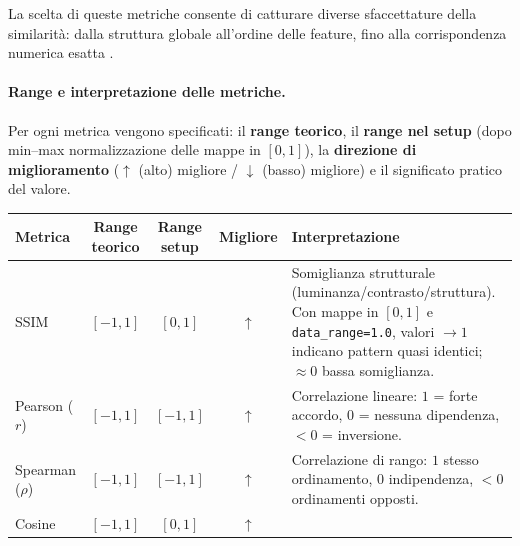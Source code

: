 \documentclass[12pt,a4paper,oneside]{report}
\numberwithin{figure}{chapter}
\numberwithin{table}{chapter}
\begin{document}
La scelta di queste metriche consente di catturare diverse sfaccettature della
similarità: dalla struttura globale all’ordine delle feature, fino alla
corrispondenza numerica esatta \citep{leventi2023consistency,
      samek2016evaluating}.

\paragraph{Range e interpretazione delle metriche.}
Per ogni metrica vengono specificati: il \textbf{range teorico}, il
\textbf{range nel setup} (dopo min–max normalizzazione delle mappe in $[0,1]$),
la \textbf{direzione di miglioramento} ($\uparrow$ (alto) migliore / $\downarrow$ (basso)
migliore) e il significato pratico del valore.

\begin{table}[H]
      \centering
      \begin{minipage}{0.98\linewidth}
            \small
            \setlength{\tabcolsep}{5pt}
            \renewcommand{\arraystretch}{1.15}
            \begin{tabularx}{\linewidth}{l c c c Y}
                  \hline
                  \textbf{Metrica}  & \textbf{Range teorico} & \textbf{Range setup} & \textbf{Migliore} & \textbf{Interpretazione}                                                                             \\
                  \hline
                  SSIM              & $[-1,1]$               & $[0,1]$            & $\uparrow$      &
                  Somiglianza strutturale (luminanza/contrasto/struttura). Con mappe in $[0,1]$ e \texttt{data\_range=1.0}, valori $\to 1$ indicano pattern quasi identici; $\approx 0$ bassa somiglianza. \\
                  Pearson ($r$)     & $[-1,1]$               & $[-1,1]$           & $\uparrow$      &
                  Correlazione lineare: $1$ = forte accordo, $0$ = nessuna dipendenza, $<0$ = inversione.                                                                                                  \\
                  Spearman ($\rho$) & $[-1,1]$               & $[-1,1]$           & $\uparrow$      &
                  Correlazione di rango: $1$ stesso ordinamento, $0$ indipendenza, $<0$ ordinamenti opposti.                                                                                               \\
                  Cosine            & $[-1,1]$               & $[0,1]$            & $\uparrow$      &

\end{tabularx}
\end{minipage}
\end{table}
\end{document}
